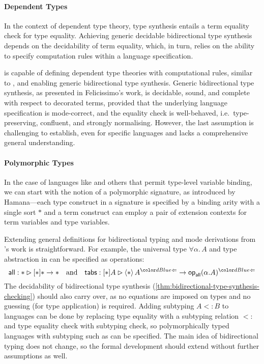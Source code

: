 \paragraph{Dependent Types}
In the context of dependent type theory, type synthesis entails a term equality check for type equality.
Achieving generic decidable bidirectional type synthesis depends on the decidability of term equality, which, in turn, relies on the ability to specify computation rules within a language specification.

 is capable of defining dependent type theories with computational rules, similar to \Dedukti, and enabling generic bidirectional type synthesis.
Generic bidirectional type synthesis, as presented in Felicissimo's work, is decidable, sound, and complete with respect to decorated terms, provided that the underlying language specification is mode-correct, and the equality check is well-behaved, i.e.\ type-preserving, confluent, and strongly normalising.
However, the last assumption is challenging to establish, even for specific languages and lacks a comprehensive general understanding.

\paragraph{Polymorphic Types}
In the case of languages like \SystemF and others that permit type-level variable binding, we can start with the notion of a polymorphic signature, as introduced by Hamana---each type construct in a signature is specified by a binding arity with a single sort $*$ and a term construct can employ a pair of extension contexts for term variables and type variables.

Extending general definitions for bidirectional typing and mode derivations from \citeauthor{Hamana2011}'s work is straightforward. 
For example, the universal type $\forall \alpha.\, A$ and type abstraction in \SystemF can be specified as operations:
\[
\mathsf{all} : * \rhd [*] * \to *
\quad\text{and}\quad
\mathsf{tabs} : [*] A \rhd \left< * \right> A^{\chk} \to \tyOp_{\mathsf{all}}(\alpha. A)^{\chk}
\]
The decidability of bidirectional type synthesis (\cref{thm:bidirectional-type-synthesis-checking}) should also carry over, as no equations are imposed on types and no guessing (for type application) is required.
Adding subtyping $A \mathrel{<:} B$ to languages can be done by replacing type equality with a subtyping relation $\mathrel{<:}$ and type equality check with subtyping check, so polymorphically typed languages with subtyping such as \SystemFsub can be specified.
The main idea of bidirectional typing does not change, so the formal development should extend without further assumptions as well.

